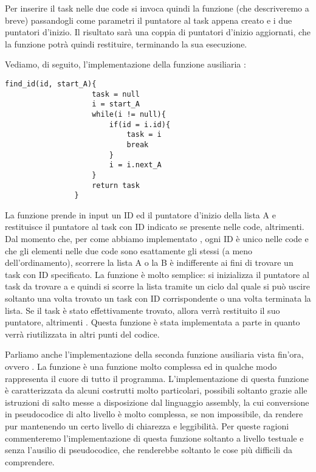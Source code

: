         Per inserire il task nelle due code si invoca quindi la funzione  (che descriveremo a breve) passandogli come parametri il puntatore al task appena creato e i due puntatori d'inizio. Il risultato sarà una coppia di puntatori d'inizio aggiornati, che la funzione  potrà quindi restituire, terminando la sua esecuzione.
        
        Vediamo, di seguito, l'implementazione della funzione ausiliaria :
        
        \begin{center}
           	\begin{lstlisting}[language=pseudo, gobble=14]
                find_id(id, start_A){
                    task = null
                    i = start_A
                    while(i != null){
                        if(id = i.id){
                            task = i
                            break
                        }
                        i = i.next_A
                    }
                    return task
                }\end{lstlisting}
        \end{center}
        
        La funzione  prende in input un ID ed il puntatore d'inizio della lista A e restituisce il puntatore al task con ID indicato se presente nelle code,  altrimenti. Dal momento che, per come abbiamo implementato , ogni ID è unico nelle code e che gli elementi nelle due code sono esattamente gli stessi (a meno dell'ordinamento), scorrere la lista A o la B è indifferente ai fini di trovare un task con ID specificato. La funzione è molto semplice: si inizializza il puntatore al task da trovare a  e quindi si scorre la lista tramite un ciclo dal quale si può uscire soltanto una volta trovato un task con ID corrispondente o una volta terminata la lista. Se il task è stato effettivamente trovato, allora verrà restituito il suo puntatore, altrimenti . Questa funzione è stata implementata a parte in quanto verrà riutilizzata in altri punti del codice.
        
        Parliamo anche l'implementazione della seconda funzione ausiliaria vista fin'ora, ovvero . La funzione  è una funzione molto complessa ed in qualche modo rappresenta il cuore di tutto il programma. L'implementazione di questa funzione è caratterizzata da alcuni costrutti molto particolari, possibili soltanto grazie alle istruzioni di salto messe a disposizione dal linguaggio assembly, la cui conversione in pseudocodice di alto livello è molto complessa, se non impossibile, da rendere pur mantenendo un certo livello di chiarezza e leggibilità. Per queste ragioni commenteremo l'implementazione di questa funzione soltanto a livello testuale e senza l'ausilio di pseudocodice, che renderebbe soltanto le cose più difficili da comprendere.
        
